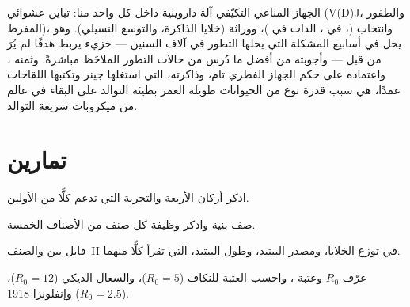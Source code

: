 \begin{remark}\label{rem:b3:adaptive-immunity:memory}
الجهاز المناعي التكيّفي آلة داروينية داخل كل واحد منا: تباين
عشوائي (V(D)J، والطفور المفرط)، وانتخاب (، في ،  الذات في )، ووراثة (خلايا الذاكرة،
والتوسع النسيلي). وهو يحل في أسابيع المشكلة التي يحلها
التطور في آلاف السنين --- جزيء يربط هدفًا لم يُرَ من قبل
--- وأجوبته من أفضل ما دُرس من حالات التطور الملاحَظ
مباشرةً. وثمنه ، واعتماده على حكم الجهاز
الفطري تام، وذاكرته، التي استغلها جينر وتكتبها اللقاحات
عمدًا، هي سبب قدرة نوع من الحيوانات طويلة العمر بطيئة
التوالد على البقاء في عالم من ميكروبات سريعة التوالد.
\end{remark}

\section{تمارين}

\begin{exercise}[$\star$]\label{exo:b3:adaptive-immunity:1}
اذكر أركان  الأربعة والتجربة التي تدعم
كلًّا من الأولين.
\end{exercise}

\begin{exercise}[$\star$]\label{exo:b3:adaptive-immunity:2}
صف بنية  واذكر وظيفة كل صنف من الأصناف الخمسة.
\end{exercise}

\begin{exercise}[$\star$]\label{exo:b3:adaptive-immunity:3}
قابل بين  والصنف~II في توزع الخلايا، ومصدر
الببتيد، وطول الببتيد،  التي تقرأ كلًّا منهما.
\end{exercise}

\begin{exercise}[$\star$]\label{exo:b3:adaptive-immunity:4}
عرّف $R_{0}$ وعتبة ، واحسب العتبة للنكاف
($R_{0} = 5$)، والسعال الديكي ($R_{0} = 12$)، وإنفلونزا
1918 ($R_{0} = 2.5$).
\end{exercise}

